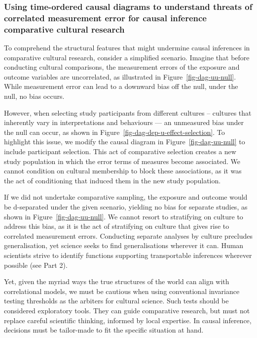 \documentclass[
  singlecolumn]{article}
\begin{document}
\subsubsection{Using time-ordered causal diagrams to understand threats
of correlated measurement error for causal inference comparative
cultural
research}\label{using-time-ordered-causal-diagrams-to-understand-threats-of-correlated-measurement-error-for-causal-inference-comparative-cultural-research}

To comprehend the structural features that might undermine causal
inferences in comparative cultural research, consider a simplified
scenario. Imagine that before conducting cultural comparisons, the
measurement errors of the exposure and outcome variables are
uncorrelated, as illustrated in Figure~\ref{fig-dag-uu-null}. While
measurement error can lead to a downward bias off the null, under the
null, no bias occurs.

However, when selecting study participants from different cultures --
cultures that inherently vary in interpretations and behaviours --- an
unmeasured bias under the null can occur, as shown in
Figure~\ref{fig-dag-dep-u-effect-selection}. To highlight this issue, we
modify the causal diagram in Figure~\ref{fig-dag-uu-null} to include
participant selection. This act of comparative selection creates a new
study population in which the error terms of measures become associated.
We cannot condition on cultural membership to block these associations,
as it was the act of conditioning that induced them in the new study
population.

If we did not undertake comparative sampling, the exposure and outcome
would be d-separated under the given scenario, yielding no bias for
separate studies, as shown in Figure~\ref{fig-dag-uu-null}. We cannot
resort to stratifying on culture to address this bias, as it is the act
of stratifying on culture that gives rise to correlated measurement
errors. Conducting separate analyses by culture precludes
generalisation, yet science seeks to find generalisations wherever it
can. Human scientists strive to identify functions supporting
transportable inferences wherever possible (see Part 2).

Yet, given the myriad ways the true structures of the world can align
with correlational models, we must be cautious when using conventional
invariance testing thresholds as the arbiters for cultural science. Such
tests should be considered exploratory tools. They can guide comparative
research, but must not replace careful scientific thinking, informed by
local expertise. In causal inference, decisions must be tailor-made to
fit the specific situation at hand.
\end{document}
